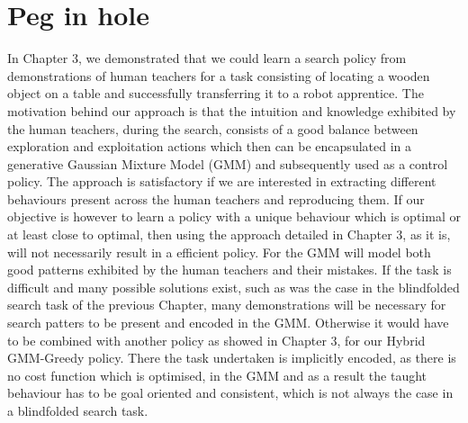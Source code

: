 \chapter{Peg in hole}

In Chapter 3, we demonstrated that we could learn a search policy from demonstrations of human teachers for a task consisting of locating a wooden 
object on a table and successfully transferring it to a robot apprentice. The motivation behind our approach is that the intuition 
and knowledge exhibited by the human teachers, during the search, consists of a good balance between exploration and 
exploitation actions which then can be encapsulated in a generative Gaussian Mixture Model (GMM) and subsequently used as a control policy. The approach
is satisfactory if we are interested in extracting different behaviours present across the human teachers and reproducing 
them. If our objective is however to learn a policy with a unique behaviour which is optimal or at least close to optimal, then using  
the approach detailed in Chapter 3, as it is, will not necessarily result in a efficient policy. For the GMM will model
both good patterns exhibited by the human teachers and their mistakes. If the task is difficult and many possible solutions exist, such 
as was the case in the blindfolded search task of the previous Chapter, many demonstrations will be necessary for search patters to be 
present and encoded in the GMM. Otherwise it would have to be combined with another policy as showed in Chapter 3, for our Hybrid GMM-Greedy 
policy. There the task undertaken is implicitly encoded, as there is no cost function which is optimised, in 
the GMM and as a result the taught behaviour has to be goal oriented and consistent, which is not always the case in a blindfolded search task. 

